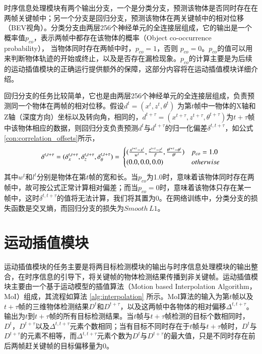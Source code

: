 时序信息处理模块有两个输出分支，一个是分类分支，预测该物体是否同时存在在两帧关键帧中；另一个分支是回归分支，预测该物体在两关键帧中的相对位移（BEV视角）。分类分支由两层256个神经单元的全连接层组成，它的输出是一个概率值$p_{co}$，表示两帧中都存在该物体的概率（Object co-occurrence probability）， 当物体同时存在两帧中时，$p_{co} = 1$，否则 $p_{co} = 0$。$p_{co}$的值可以用来判断物体轨迹的开始或终止，以及是否存在漏检现象。$p_{co}$的计算主要是为后续的运动插值模块的正确运行提供额外的保障，这部分内容将在运动插值模块详细介绍。

回归分支的任务比较简单，它也是由两层256个神经单元的全连接层组成，负责预测同一个物体在两帧的相对位移。假设$d^t = (x^t, z^t,\theta^t)$ 为第$t$帧中一物体的X轴和Z轴（深度方向）坐标以及转向角，相同的，$d^{t+\tau} = (x^{t+\tau}, z^{t+\tau},\theta^{t+\tau})$为$t+\tau$帧中该物体相应的数据，则回归分支负责预测$d^t$与$d^{t+\tau}$的归一化偏差$\delta^{t,t+\tau}$，如公式\ref{con:correlation_offsets}所示，
\begin{equation}
\delta^{t, t+\tau} = (\delta_x^{t,t+\tau}, \delta_z^{t,t+\tau}, \delta_{\theta}^{t,t+\tau}) = \\
\begin{cases}
(\frac{x^{t+\tau} - x^{t}}{w^t}, \frac{z^{t+\tau} - z^{t}}{l^t}, \frac{\theta^{t+\tau} - \theta^{t}}{\theta^t}) & p_{co} = 1.0 \\
(0.0,0.0, 0.0) &  otherwise
\end{cases}
\label{con:correlation_offsets}
\end{equation}
其中$w^t$和$l^t$分别是物体在第$t$帧的宽和长。当$p_{co}$为1.0时，意味着该物体同时存在两帧中，故可按公式正常计算相对偏差；而当$p_{co} = 0$时，意味着该物体只存在某一帧中，这时$\delta^{t,t+\tau}$的值将无法计算，我们将其置为0。在网络训练中，分类分支的损失函数是交叉熵，而回归分支的损失为$Smooth \, L1$。

\section{运动插值模块}
\label{interpolation}
运动插值模块的任务主要是将两目标检测模块的输出与时序信息处理模块的输出整合，在时序信息的引导下，将关键帧的物体检测结果传播到非关键帧。运动插值模块主要由一个基于运动模型的插值算法（Motion based Interpolation Algorithm，MoI）组成，其流程如算法 \ref{alg:interpolation} 所示。MoI算法的输入为第$t$帧以及$t+\tau$帧的三维物体检测结果$D^t$和$D^{t+\tau}$，以及这两帧中各物体的相对偏移$\Delta^{t,t+\tau}$。输出为$t$到$t+\tau$帧的所有目标检测结果。当$t$帧与$t+\tau$帧检测的目标个数相同时，$D^t，D^{t+\tau}$以及$\Delta^{t,t+\tau}$元素个数相同；当有目标不同时存在于$t$帧与$t+\tau$帧时，$D^t$与$D^{t+\tau}$的元素不相等，而$\Delta^{t,t+\tau}$元素个数为$D^t$与$D^{t+\tau}$的最大值，只是不同时存在前后两帧赶关键帧的目标偏移量为0。


